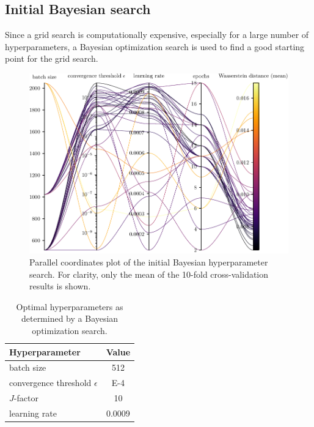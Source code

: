 \subsection{Initial Bayesian search} \label{sec:hyperparameters:initial_bayesian}
Since a grid search is computationally expensive,
  especially for a large number of hyperparameters,
a Bayesian optimization search \cite{wandb_bayesian} is used to find a good starting point for the grid search.

\begin{figure}
  \centering
  \includegraphics[scale=1]{content/plots/hyperparam/combined_pcplot_full.pdf}
  \caption{
    Parallel coordinates plot of the initial Bayesian hyperparameter search.
    For clarity, only the mean of the 10-fold cross-validation results is shown.
    }
  \label{fig:hyperparameter:bayesian}
\end{figure}

\begin{table}
    \centering
    \caption{
      Optimal hyperparameters as determined by a Bayesian optimization search.
    }
    \label{tab:hyperparameters:initial}
    \begin{tabular}{l S}
        \toprule
        Hyperparameter & {Value} \\
        \midrule
        batch size & 512 \\
        convergence threshold $\epsilon$ & E-4 \\
        $J$-factor & 10 \\
        learning rate & 0.0009 \\
        \bottomrule
    \end{tabular}
\end{table}


